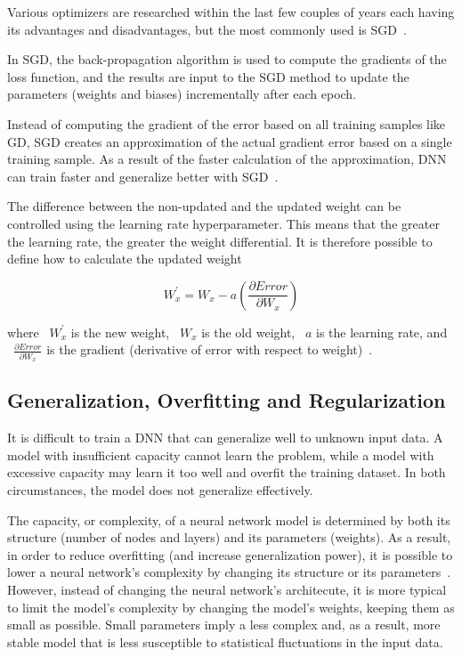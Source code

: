 Various optimizers are researched within the last few couples of years each having its advantages and disadvantages, but the most commonly used is \gls{SGD}~\cite{Chauhan2020OptimizationNetworks}.

In \gls{SGD}, the back-propagation algorithm is used to compute the gradients of the loss function, and the results are input to the \gls{SGD} method to update the parameters (weights and biases) incrementally after each epoch.

Instead of computing the gradient of the error based on all training samples like GD, \gls{SGD} creates an approximation of the actual gradient error based on a single training sample. As a result of the faster calculation of the approximation, \gls{DNN} can train faster and generalize better with \gls{SGD}~\cite{Amir2021SGDHelp}.

The difference between the non-updated and the updated weight can be controlled using the learning rate hyperparameter. This means that the greater the learning rate, the greater the weight differential. It is therefore possible to define how to calculate the updated weight

\begin{equation}\label{eq:4}
    W_{x}^{'} = W_{x} - a(\frac{\partial Error}{\partial W_{x}})
\end{equation}

where ~$W_{x}^{'}$ is the new weight, ~$W_{x}$ is the old weight, ~$a$ is the learning rate, and ~$\frac{\partial Error}{\partial W_{x}}$ is the gradient (derivative of error with respect to weight)~\cite{Kim2021EasyAlgorithm}.

\subsection{Generalization, Overfitting and Regularization}

It is difficult to train a \gls{DNN} that can generalize well to unknown input data. A model with insufficient capacity cannot learn the problem, while a model with excessive capacity may learn it too well and overfit the training dataset. In both circumstances, the model does not generalize effectively. 

The capacity, or complexity, of a neural network model is determined by both its structure (number of nodes and layers) and its parameters (weights). As a result, in order to reduce overfitting (and increase generalization power), it is possible to lower a neural network's complexity by changing its structure or its parameters~\cite{Brownlee2019HowNetworks}. However, instead of changing the neural network's architecute, it is more typical to limit the model's complexity by changing the model's weights, keeping them as small as possible. Small parameters imply a less complex and, as a result, more stable model that is less susceptible to statistical fluctuations in the input data.

